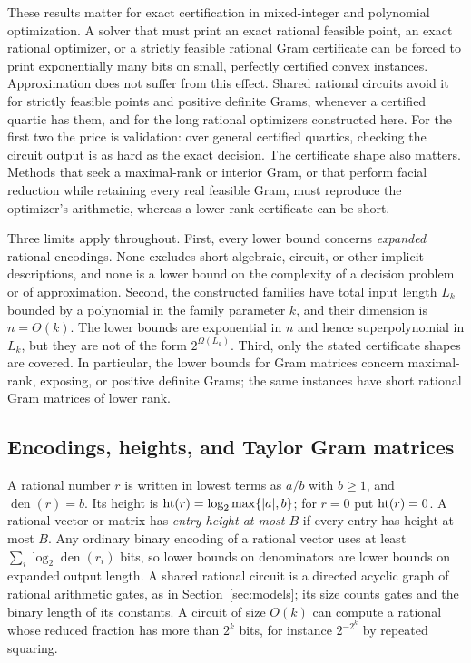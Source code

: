 These results matter for exact certification in mixed-integer and
polynomial optimization. A solver that must print an exact rational feasible
point, an exact rational optimizer, or a strictly feasible rational Gram
certificate can be forced to print exponentially many bits on small,
perfectly certified convex instances. Approximation does not suffer from this
effect. Shared rational circuits avoid it for strictly feasible points and
positive definite Grams, whenever a certified quartic has them, and for the
long rational optimizers constructed here. For the first two the price is
validation: over general certified quartics, checking the circuit output is
as hard as the exact decision. The certificate shape also matters. Methods
that seek a maximal-rank or interior Gram, or that perform facial reduction while
retaining every real feasible Gram, must reproduce the optimizer's
arithmetic, whereas a lower-rank certificate can be short.

Three limits apply throughout. First, every lower bound concerns
\emph{expanded} rational encodings. None excludes short algebraic,
circuit, or other implicit descriptions, and none is a lower bound on the
complexity of a decision problem or of approximation. Second, the
constructed families have total input length $L_k$ bounded by a polynomial
in the family parameter $k$, and their dimension is $n=\Theta(k)$. The lower
bounds are exponential in $n$ and hence superpolynomial in $L_k$, but they
are not of the form $2^{\Omega(L_k)}$. Third, only the stated certificate
shapes are covered. In particular, the lower bounds for Gram matrices concern
maximal-rank, exposing, or positive definite Grams; the same instances have
short rational Gram matrices of lower rank.

\subsection{Encodings, heights, and Taylor Gram matrices}
\label{sec:heights-conventions}

A rational number $r$ is written in lowest terms as $a/b$ with $b\ge1$, and
$\operatorname{den}(r)=b$. Its height is $\operatorname{ht}(r)=\log_2\max\{|a|,b\}$;
for $r=0$ put $\operatorname{ht}(r)=0$. A rational vector or matrix has \emph{entry
height at most $B$} if every entry has height at most $B$. Any ordinary
binary encoding of a rational vector uses at least
$\sum_i\log_2\operatorname{den}(r_i)$ bits, so lower bounds on denominators
are lower bounds on expanded output length. A shared rational circuit is a
directed acyclic graph of rational arithmetic gates, as in
Section~\ref{sec:models}; its size counts gates and the binary length of its
constants. A circuit of size $O(k)$ can compute a rational whose reduced
fraction has more than $2^k$ bits, for instance $2^{-2^k}$ by repeated
squaring.

